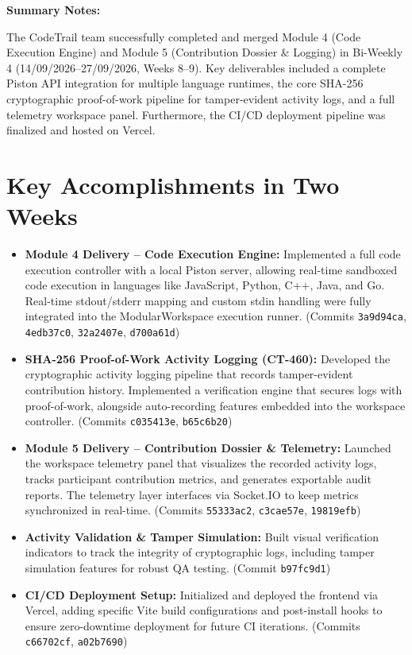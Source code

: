 \documentclass[11pt,a4paper]{article}
\begin{document}
\vspace{8pt}
\textbf{Summary Notes:}

The CodeTrail team successfully completed and merged Module 4 (Code Execution Engine) and Module 5 (Contribution Dossier & Logging) in Bi-Weekly 4 (14/09/2026--27/09/2026, Weeks 8--9). Key deliverables included a complete Piston API integration for multiple language runtimes, the core SHA-256 cryptographic proof-of-work pipeline for tamper-evident activity logs, and a full telemetry workspace panel. Furthermore, the CI/CD deployment pipeline was finalized and hosted on Vercel.

\section{Key Accomplishments in Two Weeks}

\begin{itemize}
    \item \textbf{Module 4 Delivery -- Code Execution Engine:} Implemented a full code execution controller with a local Piston server, allowing real-time sandboxed code execution in languages like JavaScript, Python, C++, Java, and Go. Real-time stdout/stderr mapping and custom stdin handling were fully integrated into the ModularWorkspace execution runner. (Commits \texttt{3a9d94ca}, \texttt{4edb37c0}, \texttt{32a2407e}, \texttt{d700a61d})
    
    \item \textbf{SHA-256 Proof-of-Work Activity Logging (CT-460):} Developed the cryptographic activity logging pipeline that records tamper-evident contribution history. Implemented a verification engine that secures logs with proof-of-work, alongside auto-recording features embedded into the workspace controller. (Commits \texttt{c035413e}, \texttt{b65c6b20})
    
    \item \textbf{Module 5 Delivery -- Contribution Dossier & Telemetry:} Launched the workspace telemetry panel that visualizes the recorded activity logs, tracks participant contribution metrics, and generates exportable audit reports. The telemetry layer interfaces via Socket.IO to keep metrics synchronized in real-time. (Commits \texttt{55333ac2}, \texttt{c3cae57e}, \texttt{19819efb})
    
    \item \textbf{Activity Validation \& Tamper Simulation:} Built visual verification indicators to track the integrity of cryptographic logs, including tamper simulation features for robust QA testing. (Commit \texttt{b97fc9d1})
    
    \item \textbf{CI/CD Deployment Setup:} Initialized and deployed the frontend via Vercel, adding specific Vite build configurations and post-install hooks to ensure zero-downtime deployment for future CI iterations. (Commits \texttt{c66702cf}, \texttt{a02b7690})
\end{itemize}
\end{document}
